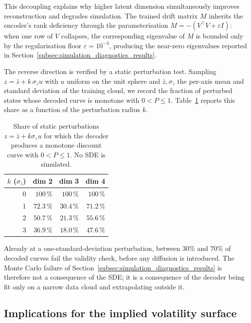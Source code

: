 This decoupling explains why higher latent dimension simultaneously
improves reconstruction and degrades simulation. The trained drift
matrix $M$ inherits the encoder's rank deficiency through the
parameterisation \(M=-(V^{\!\top}V+\varepsilon I)\): when one row of
$V$ collapses, the corresponding eigenvalue of $M$ is bounded only by
the regularisation floor $\varepsilon=10^{-3}$, producing the
near-zero eigenvalues reported in
Section~\ref{subsec:simulation_diagnostics_results}.

The reverse direction is verified by a static perturbation test.
Sampling \(z=\bar z+ k\,\sigma_z u\) with $u$ uniform on the unit
sphere and $\bar z,\sigma_z$ the per-axis mean and standard
deviation of the training cloud, we record the fraction of perturbed
states whose decoded curve is monotone with \(0<P\le1\).
Table~\ref{tab:static_perturbation} reports this share as a function
of the perturbation radius $k$.

\begin{table}[ht]
  \centering
  \caption{Share of static perturbations
    \(z=\bar z+k\sigma_z u\) for which the decoder produces a
    monotone discount curve with \(0<P\le1\). No SDE is simulated.}
  \label{tab:static_perturbation}
  \begin{tabular}{rrrr}
    \toprule
    $k$ ($\sigma_z$) & dim 2 & dim 3 & dim 4 \\
    \midrule
    0 & $100$\,\% & $100$\,\% & $100$\,\% \\
    1 & $72.3$\,\% & $30.4$\,\% & $71.2$\,\% \\
    2 & $50.7$\,\% & $21.3$\,\% & $55.6$\,\% \\
    3 & $36.9$\,\% & $18.0$\,\% & $47.6$\,\% \\
    \bottomrule
  \end{tabular}
\end{table}

Already at a one-standard-deviation perturbation, between $30\%$
and $70\%$ of decoded curves fail the validity check, before any
diffusion is introduced. The Monte Carlo failure of
Section~\ref{subsec:simulation_diagnostics_results} is therefore not
a consequence of the SDE; it is a consequence of the decoder being
fit only on a narrow data cloud and extrapolating outside it.

\subsection{Implications for the implied volatility surface}
\label{subsec:diagnostics_implications}

